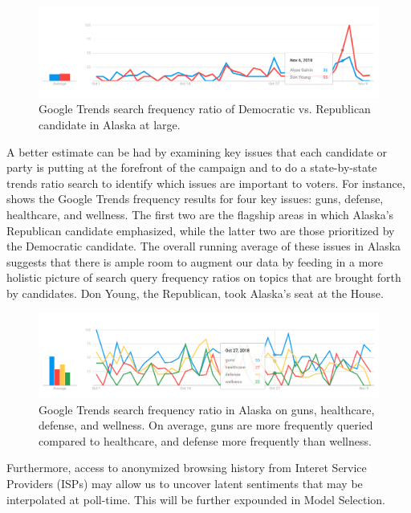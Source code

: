 \documentclass[12pt, letterpaper]{article}
\begin{document}
\begin{figure}[tbh]
  \centering
  \includegraphics[scale=0.4]{alaska_candidate}
  \caption{Google Trends search frequency ratio of Democratic vs. Republican candidate in Alaska at large.}
  \label{fig:candidate_only}
\end{figure}

A better estimate can be had by examining key issues that each candidate or party is putting at the forefront of the campaign and to do a state-by-state trends ratio search to identify which issues are important to voters. For instance,  shows the Google Trends frequency results for four key issues: guns, defense, healthcare, and wellness. The first two are the flagship areas in which Alaska's Republican candidate emphasized, while the latter two are those prioritized by the Democratic candidate. The overall running average of these issues in Alaska suggests that there is ample room to augment our data by feeding in a more holistic picture of search query frequency ratios on topics that are brought forth by candidates. Don Young, the Republican, took Alaska's seat at the House.

\begin{figure}[tbh]
  \centering
  \includegraphics[scale=0.4]{trends_issues}
  \caption{Google Trends search frequency ratio in Alaska on guns, healthcare, defense, and wellness. On average, guns are more frequently queried compared to healthcare, and defense more frequently than wellness.}
  \label{fig:trends_issues}
\end{figure}

Furthermore, access to anonymized browsing history from Interet Service Providers (ISPs) may allow us to uncover latent sentiments that may be interpolated at poll-time. This will be further expounded in Model Selection. 
\end{document}
